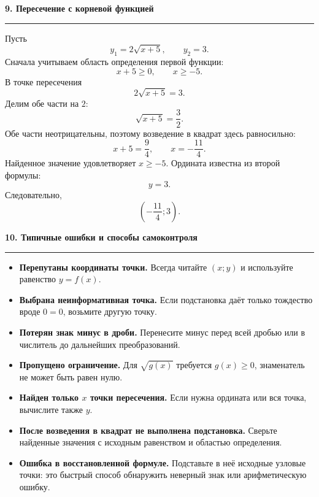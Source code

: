 \documentclass[a4paper,12pt]{article}
\newcommand{\topic}[1]{%
  \Needspace{7\baselineskip}%
  \vspace{0.45em}%
  {\Large\bfseries\color{darkaccent} #1}\par
  \vspace{0.2em}%
  {\color{accent}\rule{\linewidth}{0.7pt}}\par
  \vspace{0.35em}%
}
\begin{document}
\topic{9. Пересечение с корневой функцией}

Пусть
\[
y_1=2\sqrt{x+5},
\qquad
y_2=3.
\]
Сначала учитываем область определения первой функции:
\[
x+5\ge0,
\qquad
\boxed{x\ge-5}.
\]
В точке пересечения
\[
2\sqrt{x+5}=3.
\]
Делим обе части на $2$:
\[
\sqrt{x+5}=\frac32.
\]
Обе части неотрицательны, поэтому возведение в квадрат здесь равносильно:
\[
x+5=\frac94,
\qquad
x=-\frac{11}{4}.
\]
Найденное значение удовлетворяет $x\ge-5$. Ордината известна из второй формулы:
\[
y=3.
\]
Следовательно,
\[
\boxed{\left(-\frac{11}{4};3\right)}.
\]

\topic{10. Типичные ошибки и способы самоконтроля}

\begin{itemize}[leftmargin=7mm,itemsep=0.45em]

  \item
  \textbf{Перепутаны координаты точки.}
  Всегда читайте $(x;y)$ и используйте равенство $y=f(x)$.

  \item
  \textbf{Выбрана неинформативная точка.}
  Если подстановка даёт только тождество вроде $0=0$, возьмите другую точку.

  \item
  \textbf{Потерян знак минус в дроби.}
  Перенесите минус перед всей дробью или в числитель до дальнейших преобразований.

  \item
  \textbf{Пропущено ограничение.}
  Для $\sqrt{g(x)}$ требуется $g(x)\ge0$, знаменатель не может быть равен нулю.

  \item
  \textbf{Найден только $x$ точки пересечения.}
  Если нужна ордината или вся точка, вычислите также $y$.

  \item
  \textbf{После возведения в квадрат не выполнена подстановка.}
  Сверьте найденные значения с исходным равенством и областью определения.

  \item
  \textbf{Ошибка в восстановленной формуле.}
  Подставьте в неё исходные узловые точки: это быстрый способ обнаружить неверный знак или арифметическую ошибку.

\end{itemize}

\clearpage

\thispagestyle{fancy}
\end{document}
